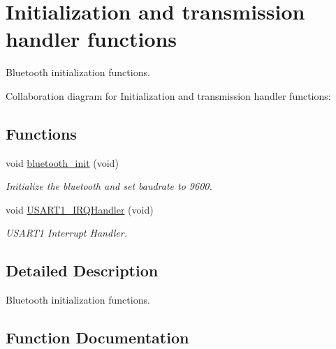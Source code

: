 \hypertarget{group___bluetooth___init}{}\section{Initialization and transmission handler functions}
\label{group___bluetooth___init}


Bluetooth initialization functions.  


Collaboration diagram for Initialization and transmission handler functions\+:
\subsection*{Functions}
\begin{DoxyCompactItemize}
\item 
void \hyperlink{group___bluetooth___init_gaaa60810e0857e9e1e5b2cba80b8db3ff}{bluetooth\+\_\+init} (void)
\begin{DoxyCompactList}\small\item\em Initialize the bluetooth and set baudrate to 9600. \end{DoxyCompactList}\item 
void \hyperlink{group___bluetooth___init_ga7139cd4baabbbcbab0c1fe6d7d4ae1cc}{U\+S\+A\+R\+T1\+\_\+\+I\+R\+Q\+Handler} (void)
\begin{DoxyCompactList}\small\item\em U\+S\+A\+R\+T1 Interrupt Handler. \end{DoxyCompactList}\end{DoxyCompactItemize}


\subsection{Detailed Description}
Bluetooth initialization functions. 



\subsection{Function Documentation}
\mbox{\label{group___bluetooth___init_gaaa60810e0857e9e1e5b2cba80b8db3ff}} 
